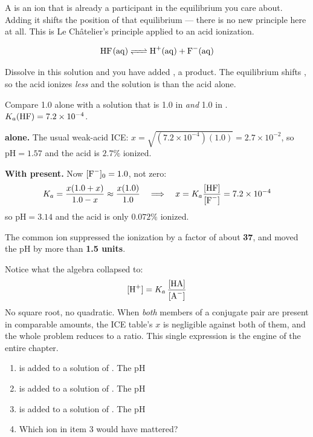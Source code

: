 \documentclass{apchem-notes}
\begin{document}


A  is an ion that is already a participant in the
equilibrium you care about. Adding it shifts the position of that
equilibrium  --- there is no new principle
here at all. This is Le Ch\^atelier's principle applied to an acid
ionization.

\[ \ce{HF(aq) <=> H+(aq) + F^-(aq)} \]

Dissolve  in this solution and you have added , a product.
The equilibrium shifts , so the acid ionizes
\emph{less} and the solution is  than the
acid alone.

\begin{workedexample}
Compare \SI{1.0}{\Molar}  alone with a solution that is
\SI{1.0}{\Molar} in  \emph{and} \SI{1.0}{\Molar} in .
$K_a(\ce{HF}) = 7.2\times10^{-4}$.

\textbf{ alone.} The usual weak-acid ICE:
$x = \sqrt{(7.2\times10^{-4})(1.0)} = 2.7\times10^{-2}$, so
$\mathrm{pH} = \mathbf{1.57}$ and the acid is $\mathbf{2.7\%}$ ionized.

\textbf{With  present.} Now $[\ce{F-}]_0 = 1.0$, not zero:
\[ K_a = \frac{x(1.0+x)}{1.0-x} \approx \frac{x(1.0)}{1.0}
   \quad\Longrightarrow\quad x = K_a\frac{[\ce{HF}]}{[\ce{F-}]}
   = 7.2\times10^{-4} \]
so $\mathrm{pH} = \mathbf{3.14}$ and the acid is only $\mathbf{0.072\%}$
ionized.

The common ion suppressed the ionization by a factor of about
\textbf{37}, and moved the pH by more than \textbf{1.5 units}.
\end{workedexample}

\begin{apctrap}
Notice what the algebra collapsed to:
\[ [\ce{H+}] = K_a\,\frac{[\ce{HA}]}{[\ce{A^-}]} \]
No square root, no quadratic. When \emph{both} members of a conjugate pair
are present in comparable amounts, the ICE table's $x$ is negligible against
both of them, and the whole problem reduces to a ratio. This single
expression is the engine of the entire chapter.
\end{apctrap}


\begin{enumerate}[leftmargin=*,itemsep=0.35em]
  \item {} is added to a solution of . The pH
  \item {} is added to a solution of . The pH
  \item {} is added to a solution of . The pH
  \item Which ion in item 3 would have mattered?
\end{enumerate}
\end{document}
